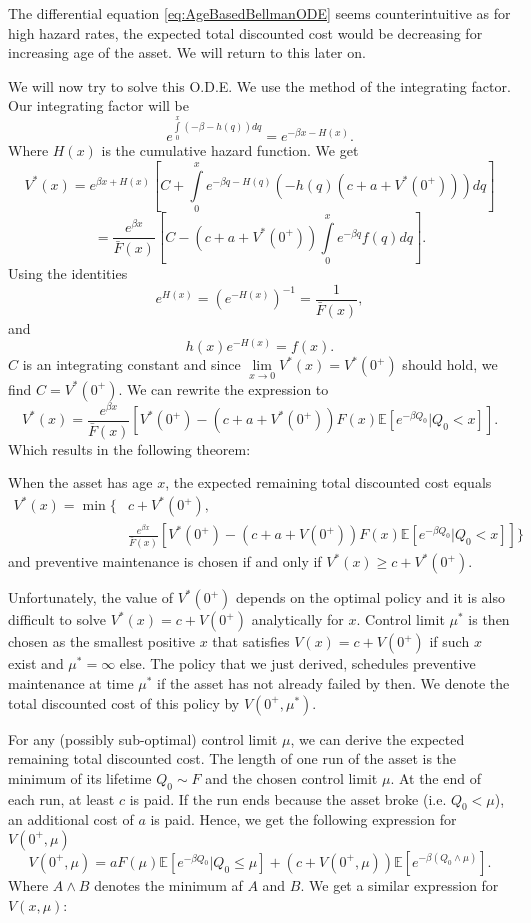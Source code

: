 \begin{remark}\label{remark:AgeBasedWeirdODE}
	The differential equation \eqref{eq:AgeBasedBellmanODE} seems counterintuitive as for high hazard rates, the expected total discounted cost would be decreasing for increasing age of the asset.
	We will return to this later on.
\end{remark}
We will now try to solve this O.D.E.
We use the method of the integrating factor.
Our integrating factor will be
$$
e^{\int\limits_0^x (-\beta - h(q))dq}=e^{-\beta x -H(x)}.
$$
Where $H(x)$ is the cumulative hazard function.
We get
$$
V^*(x)=e^{\beta x +H(x)} [C + \int\limits_0^x e^{-\beta q -H(q)}(-h(q)(c+a+V^*(0^+)))dq]
$$
$$
=\frac{e^{\beta x}}{\bar F(x)} [C - (c+a+V^*(0^+))\int\limits_0^x e^{-\beta q}f(q)dq].
$$
Using the identities 
\[e^{H(x)}=(e^{-H(x)})^{-1}=\frac{1}{\bar F(x)},\]
and
\[h(x)e^{-H(x)}=f(x).\]
$C$ is an integrating constant and since $\lim\limits_{x\rightarrow 0}V^*(x)=V^*(0^+)$ should hold, we find $C=V^*(0^+)$.
We can rewrite the expression to
$$
V^*(x)=\frac{e^{\beta x}}{\bar F(x)} [V^*(0^+)  - (c+a+V^*(0^+))F(x)\mathbb{E}[e^{-\beta Q_0}|Q_0<x]].
$$
Which results in the following theorem:
\begin{theorem}
	When the asset has age $x$, the expected remaining total discounted cost equals
	\begin{equation}\label{eq:AgeBasedSolvedBellman}
	\begin{split}
	V^*(x)=\min\{&c+V^*(0^+),\\
	&\frac{ e^{\beta x}}{\bar F(x)} [V^*(0^+) - (c+a+V(0^+))F(x)\mathbb{E}[e^{-\beta Q_0}|Q_0<x]]
	\}
	\end{split}
	\end{equation}
	and preventive maintenance is chosen if and only if $V^*(x)\geq c+V^*(0^+)$.
\end{theorem}
Unfortunately, the value of $V^*(0^+)$ depends on the optimal policy and it is also difficult to solve $V^*(x)=c+V(0^+)$ analytically for $x$.
Control limit $\mu^*$ is then chosen as the smallest positive $x$ that satisfies $V(x)=c+V(0^+)$ if such $x$ exist and $\mu^*=\infty$ else.
The policy that we just derived, schedules preventive maintenance at time $\mu^*$ if the asset has not already failed by then.
We denote the total discounted cost of this policy by $V(0^+,\mu^*)$.

For any (possibly sub-optimal) control limit $\mu$, we can derive the expected remaining total discounted cost.
The length of one run of the asset is the minimum of its lifetime $Q_0\sim F$ and the chosen control limit $\mu$.
At the end of each run, at least $c$ is paid.
If the run ends because the asset broke (i.e. $Q_0<\mu$), an additional cost of $a$ is paid.
Hence, we get the following expression for $V(0^+,\mu)$
\begin{equation}\label{eq:AgeBasedPolicyTDC}
V(0^+,\mu)=aF(\mu)\mathbb{E}[e^{-\beta Q_0}|Q_0\leq \mu]+(c+V(0^+,\mu))\mathbb{E}[e^{-\beta(Q_0\wedge\mu)}].
\end{equation}
Where $A\wedge B$ denotes the minimum af $A$ and $B$.
We get a similar expression for $V(x,\mu)$:

